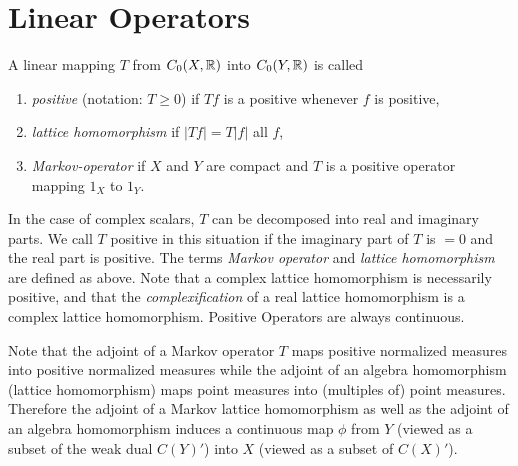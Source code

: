 \section{Linear Operators}\label{sec:b1-1.3}
A linear mapping $T$ from $C_{0}(X,\mathbb{R})$ into $C_{0}(Y,\mathbb{R})$ is called
\begin{enumerate}[label=]

\item
\emph{positive} (notation: $T \geq 0$)  if $Tf$  is a positive whenever $ f $ is positive, 

\item
\emph{lattice homomorphism}  if $|Tf| = T|f|$  all $ f $,

\item
\emph{Markov-operator}  if  $ X $ and $ Y $ are compact and $ T $ is a positive operator 
mapping $1_{X}$ to $1_{Y}$.

\end{enumerate}
In the case of complex scalars, $T$ can be decomposed into real and imaginary parts.
We call $T$ positive in this situation if the imaginary part of $T$ is $= 0$ and the real part is positive.
The terms \emph{Markov operator} and \emph{lattice homomorphism} are defined as above.
Note that a complex lattice homomorphism is necessarily positive, and that the \emph{complexification} of a real lattice homomorphism is a complex lattice homomorphism.
Positive Operators are always continuous.

Note that the adjoint of a Markov operator $T$ maps positive normalized measures into positive normalized measures while the adjoint of an algebra homomorphism (lattice homomorphism) maps point measures into (multiples of) point measures.
Therefore the adjoint of a Markov lattice homomorphism as well as the adjoint of an algebra homomorphism induces a continuous map $\phi$ from $Y$ (viewed as a subset of the weak dual $C(Y)'$) into $X$ (viewed as a subset of $C(X)'$).

